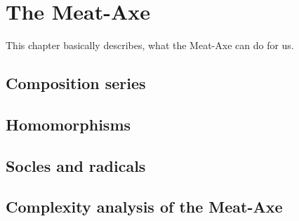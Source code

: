 
\chapter{The Meat-Axe}
\label{chap:meataxe}

This chapter basically describes, what the Meat-Axe can do for us.

\section{Composition series}

\section{Homomorphisms}

\section{Socles and radicals}

\section{Complexity analysis of the Meat-Axe}
